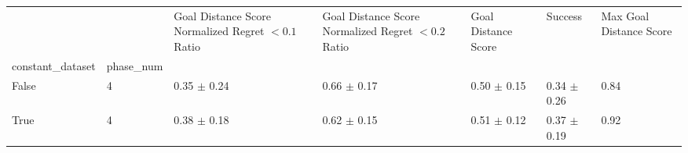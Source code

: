 \begin{tabular}{lllllll}
\toprule
 &  & Goal Distance Score Normalized Regret $< 0.1$ Ratio & Goal Distance Score Normalized Regret $< 0.2$ Ratio & Goal Distance Score & Success & Max Goal Distance Score \\
constant_dataset & phase_num &  &  &  &  &  \\
\midrule
False & 4 & 0.35 $\pm$ 0.24 & 0.66 $\pm$ 0.17 & 0.50 $\pm$ 0.15 & 0.34 $\pm$ 0.26 & 0.84 \\
\cline{1-7}
True & 4 & 0.38 $\pm$ 0.18 & 0.62 $\pm$ 0.15 & 0.51 $\pm$ 0.12 & 0.37 $\pm$ 0.19 & 0.92 \\
\cline{1-7}
\bottomrule
\end{tabular}
